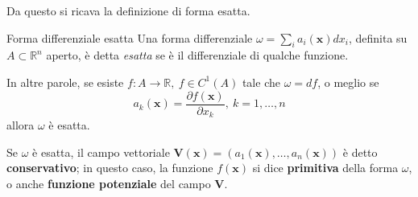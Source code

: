 \documentclass[10pt, a4paper]{scrartcl}
\theoremstyle{definition}
\numberwithin{esempio}{section}
\theoremstyle{definition}
\numberwithin{obs}{section}
\numberwithin{nota}{section}
\numberwithin{equation}{subsection}
\begin{document}
Da questo si ricava la definizione di forma esatta.
\begin{definizione}
	{Forma differenziale esatta}{}
	Una forma differenziale $\omega = \sum_{i}^{} a_i(\mathbf{x} ) dx_i$, definita su $A \subset \mathbb{R}^n$ aperto, \`e detta \textit{esatta} se \`e il differenziale di qualche funzione.

	In altre parole, se esiste $f:A \to \mathbb{R}, \ f \in C^1(A)$ tale che $\omega = df$, o meglio se
	\[
	a_k (\mathbf{x} ) = \frac{\partial f(\mathbf{x} )}{\partial x_k} , \ k=1, \ldots, n
	\] 
	allora $\omega$ \`e esatta.
\end{definizione}
\noindent Se $\omega$ \`e esatta, il campo vettoriale $\mathbf{V} (\mathbf{x} ) = (a_1(\mathbf{x} ) ,\ldots, a_n(\mathbf{x} ))$ \`e detto \textbf{conservativo}; in questo caso, la funzione $f(\mathbf{x} )$ si dice \textbf{primitiva} della forma $\omega$, o anche \textbf{funzione potenziale} del campo $\mathbf{V} $.
\end{document}
